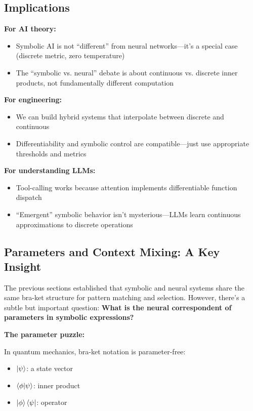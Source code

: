 \documentclass[11pt,a4paper]{article}
\theoremstyle{definition}
\begin{document}
\subsection{Implications}

\textbf{For AI theory:}
\begin{itemize}
\item Symbolic AI is not ``different'' from neural networks---it's a special case (discrete metric, zero temperature)
\item The ``symbolic vs. neural'' debate is about continuous vs. discrete inner products, not fundamentally different computation
\end{itemize}

\textbf{For engineering:}
\begin{itemize}
\item We can build hybrid systems that interpolate between discrete and continuous
\item Differentiability and symbolic control are compatible---just use appropriate thresholds and metrics
\end{itemize}

\textbf{For understanding LLMs:}
\begin{itemize}
\item Tool-calling works because attention implements differentiable function dispatch
\item ``Emergent'' symbolic behavior isn't mysterious---LLMs learn continuous approximations to discrete operations
\end{itemize}

\subsection{Parameters and Context Mixing: A Key Insight}

The previous sections established that symbolic and neural systems share the same bra-ket structure for pattern matching and selection. However, there's a subtle but important question: \textbf{What is the neural correspondent of parameters in symbolic expressions?}

\textbf{The parameter puzzle:}

In quantum mechanics, bra-ket notation is parameter-free:
\begin{itemize}
\item $\ket{\psi}$: a state vector
\item $\braket{\phi|\psi}$: inner product
\item $\ket{\phi}\bra{\psi}$: operator
\end{itemize}
\end{document}

